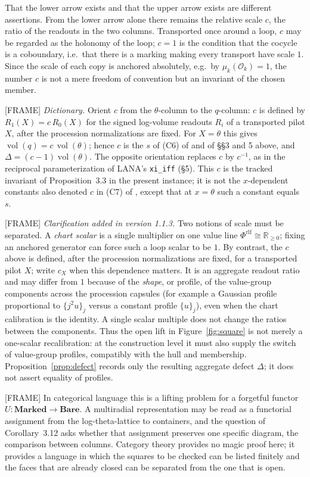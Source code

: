\documentclass[11pt]{article}
\theoremstyle{plain}
\theoremstyle{definition}
\theoremstyle{remark}
\newcommand{\FRAME}{\textup{[FRAME]}}
\newcommand{\vol}{\operatorname{vol}}
\newcommand{\cO}{\mathcal O}
\begin{document}
That the lower arrow exists and that the upper arrow exists are
different assertions.  From the lower arrow alone there remains the
relative scale $c$, the ratio of the readouts in the two columns.
Transported once around a loop, $c$ may be regarded as the holonomy
of the loop; $c=1$ is the condition that the cocycle is a
coboundary, i.e.\ that there is a marking making every transport
have scale $1$.  Since the scale of each copy is anchored
absolutely, e.g.\ by $\mu_k(\cO_k)=1$, the number $c$ is not a mere
freedom of convention but an invariant of the chosen member.

\FRAME{} \emph{Dictionary.}  Orient $c$ from the $\theta$-column to
the $q$-column: $c$ is defined by $R_1(X)=c\,R_0(X)$ for the signed
log-volume readouts $R_i$ of a transported pilot $X$, after the
procession normalizations are fixed.  For $X=\theta$ this gives
$\vol(q)=c\,\vol(\theta)$; hence $c$ is the $s$ of (C6) of
\cite{U26} and of \S\S3 and 5 above, and
$\Delta=(c-1)\vol(\theta)$.  The opposite orientation replaces $c$
by $c^{-1}$, as in the reciprocal parameterization of LANA's
\texttt{xi\_iff} (\S5).  This $c$ is the tracked invariant of
Proposition~3.3 in the present instance; it is not the
$x$-dependent constants also denoted $c$ in (C7) of \cite{U26},
except that at $x=\theta$ such a constant equals $s$.

\FRAME{} \emph{Clarification added in version 1.1.3.}
Two notions of scale must be separated.  A \emph{chart scalar} is a
single multiplier on one value line
$\Phi^{\mathrm{rlf}}\cong\mathbb R_{\ge0}$; fixing an anchored
generator can force such a loop scalar to be $1$.  By contrast, the
$c$ above is defined, after the procession normalizations are fixed,
for a transported pilot $X$; write $c_X$ when this dependence
matters.  It is an aggregate readout ratio and may differ from $1$
because of the \emph{shape}, or profile, of the value-group
components across the procession capsules (for example a Gaussian
profile proportional to $\{j^2u\}_j$ versus a constant profile
$\{u\}_j$), even when the chart calibration is the identity.  A
single scalar multiple does not change the ratios between the
components.  Thus the open lift in Figure~\ref{fig:square} is not
merely a one-scalar recalibration: at the construction level it must
also supply the switch of value-group profiles, compatibly with the
hull and membership.  Proposition~\ref{prop:defect} records only the
resulting aggregate defect $\Delta$; it does not assert equality of
profiles.

\FRAME{} In categorical language this is a lifting problem for a
forgetful functor $U:\mathbf{Marked}\to\mathbf{Bare}$.  A
multiradial representation may be read as a functorial assignment
from the log-theta-lattice to containers, and the question of
Corollary~3.12 asks whether that assignment preserves one specific
diagram, the comparison between columns.  Category theory provides
no magic proof here; it provides a language in which the squares to
be checked can be listed finitely and the faces that are already
closed can be separated from the one that is open.
\end{document}
